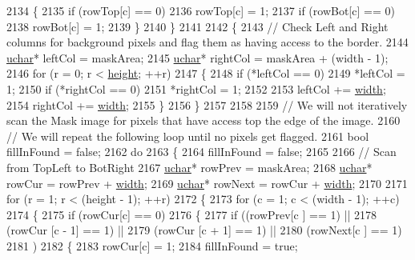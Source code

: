 \begin{DoxyCode}
2134     \{
2135       \textcolor{keywordflow}{if}  (rowTop[c] == 0)
2136         rowTop[c] = 1;
2137       \textcolor{keywordflow}{if}  (rowBot[c] == 0)
2138         rowBot[c] = 1;
2139     \}
2140   \}
2141 
2142   \{
2143     \textcolor{comment}{// Check Left and Right columns for background pixels and flag them as having access to the border.}
2144     \hyperlink{namespace_k_k_b_ace9969169bf514f9ee6185186949cdf7}{uchar}*  leftCol  = maskArea;
2145     \hyperlink{namespace_k_k_b_ace9969169bf514f9ee6185186949cdf7}{uchar}*  rightCol = maskArea + (width - 1);
2146     \textcolor{keywordflow}{for}  (r = 0;  r < \hyperlink{class_k_k_b_1_1_raster_af39ff189de4fbb6de98392e187efafb7}{height};  ++r)
2147     \{
2148       \textcolor{keywordflow}{if}  (*leftCol == 0)
2149         *leftCol = 1;
2150       \textcolor{keywordflow}{if}  (*rightCol == 0)
2151         *rightCol = 1;
2152 
2153       leftCol  += \hyperlink{class_k_k_b_1_1_raster_ae0bcc103e191c3421d7692dc69ceb554}{width};
2154       rightCol += \hyperlink{class_k_k_b_1_1_raster_ae0bcc103e191c3421d7692dc69ceb554}{width};
2155     \}
2156   \}
2157 
2158 
2159   \textcolor{comment}{// We will not iteratively scan the Mask image for pixels that have access top the edge of the image.}
2160   \textcolor{comment}{// We will repeat the following loop until no pixels get flagged.}
2161   \textcolor{keywordtype}{bool}  fillInFound = \textcolor{keyword}{false};
2162   \textcolor{keywordflow}{do}
2163   \{
2164     fillInFound = \textcolor{keyword}{false};
2165 
2166     \textcolor{comment}{// Scan from TopLeft  to  BotRight}
2167     \hyperlink{namespace_k_k_b_ace9969169bf514f9ee6185186949cdf7}{uchar}*  rowPrev  = maskArea;
2168     \hyperlink{namespace_k_k_b_ace9969169bf514f9ee6185186949cdf7}{uchar}*  rowCur   = rowPrev + \hyperlink{class_k_k_b_1_1_raster_ae0bcc103e191c3421d7692dc69ceb554}{width};
2169     \hyperlink{namespace_k_k_b_ace9969169bf514f9ee6185186949cdf7}{uchar}*  rowNext  = rowCur  + \hyperlink{class_k_k_b_1_1_raster_ae0bcc103e191c3421d7692dc69ceb554}{width};
2170 
2171     \textcolor{keywordflow}{for}  (r = 1;  r < (height - 1);  ++r)
2172     \{
2173       \textcolor{keywordflow}{for}  (c = 1;  c < (width - 1);  ++c)
2174       \{
2175         \textcolor{keywordflow}{if}  (rowCur[c] == 0)
2176         \{
2177           \textcolor{keywordflow}{if}  ((rowPrev[c    ] == 1)  ||  
2178                (rowCur [c - 1] == 1)  ||
2179                (rowCur [c + 1] == 1)  ||
2180                (rowNext[c    ] == 1)
2181               )
2182           \{
2183             rowCur[c] = 1;
2184             fillInFound = \textcolor{keyword}{true};

\end{DoxyCode}
